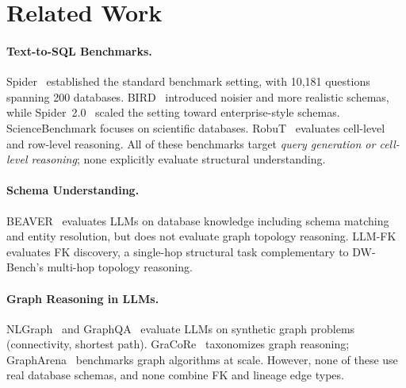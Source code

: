 \section{Related Work}

\paragraph{Text-to-SQL Benchmarks.}
Spider~\cite{yu2018spider} established the standard benchmark setting, with 10,181 questions spanning 200 databases. BIRD~\cite{li2023bird} introduced noisier and more realistic schemas, while Spider~2.0~\cite{lei2024spider2} scaled the setting toward enterprise-style schemas. ScienceBenchmark focuses on scientific databases. RobuT~\cite{zhao2023robust} evaluates cell-level and row-level reasoning. All of these benchmarks target \emph{query generation or cell-level reasoning}; none explicitly evaluate structural understanding.

\paragraph{Schema Understanding.}
BEAVER~\cite{beaver2024} evaluates LLMs on database knowledge including
schema matching and entity resolution, but does not evaluate graph topology
reasoning.  LLM-FK~\cite{tang2025llmfk} evaluates FK discovery, a single-hop
structural task complementary to DW-Bench's multi-hop topology reasoning.

\paragraph{Graph Reasoning in LLMs.}
NLGraph~\cite{wang2023nlgraph} and GraphQA~\cite{fatemi2023talk} evaluate LLMs
on synthetic graph problems (connectivity, shortest path).
GraCoRe~\cite{gracore2024} taxonomizes graph reasoning;
GraphArena~\cite{grapharena2024} benchmarks graph algorithms at scale.
However, none of these use real database schemas, and none combine FK and lineage edge types.

